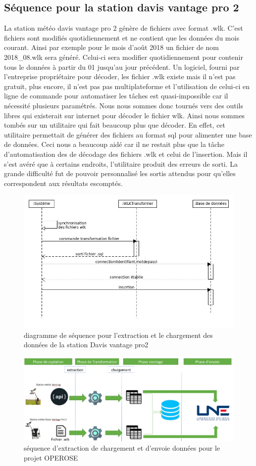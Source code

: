 \subsection{Séquence pour la station davis vantage pro 2} 
La station météo davis vantage pro 2 génère de fichiers avec format .wlk. C’est fichiers sont modifiés quotidiennement et ne contient que les données du mois courant. Ainsi par exemple pour le mois d’août 2018 un fichier de nom 2018\_08.wlk sera généré. Celui-ci sera modifier quotidiennement pour contenir tous le données à partir du 01 jusqu’au jour précédent. Un logiciel, fourni par l’entreprise propriétaire pour décoder, les fichier .wlk existe mais il n’est pas gratuit, plus encore, il n’est pas pas multiplateforme et l’utilisation de celui-ci en ligne de commande pour automatiser les tâches est quasi-impossible car il nécessité plusieurs paramétrés. Nous nous sommes donc tournés vers des outils libres qui existerait sur internet pour décoder le fichier wlk.  Ainsi nous sommes tombés sur un utilitaire qui fait beaucoup plus que décoder. En effet, cet utilitaire permettait de générer des fichiers au format sql pour alimenter une base de données. Ceci nous a beaucoup aidé car il ne restait plus que la tâche d'automatisation des  de décodage des fichiers .wlk et celui de l’insertion. Mais il s’est avéré que à certains endroits, l’utilitaire produit des erreurs de sorti. La grande difficulté fut de pouvoir personnalisé les sortis attendus pour qu’elles correspondent aux résultats escomptés. 

\begin{figure}
    
    \centering
     \includegraphics[width=.7\textwidth]{images/davis_senquence_diagrame.jpg}
     \caption{diagramme de séquence pour l'extraction et le chargement des données de la station Davis vantage pro2}
     \label{diagramme de séquence station sencrop}
\end{figure}


\begin{figure}[!h]
    \centering
     \includegraphics[width=1\textwidth]{images/processusOperose.png}
     \caption{séquence d'extraction de chargement et d'envoie données pour le projet OPEROSE}
     \label{diagremme de séquence station Davis}
\end{figure}
     

